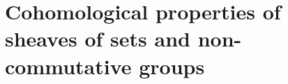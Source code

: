 \documentclass[../main.tex]{subfiles}
\begin{document}
\setcounter{chapter}{12}
\chapter{Cohomological properties of sheaves of sets and non-commutative groups}
\end{document}

